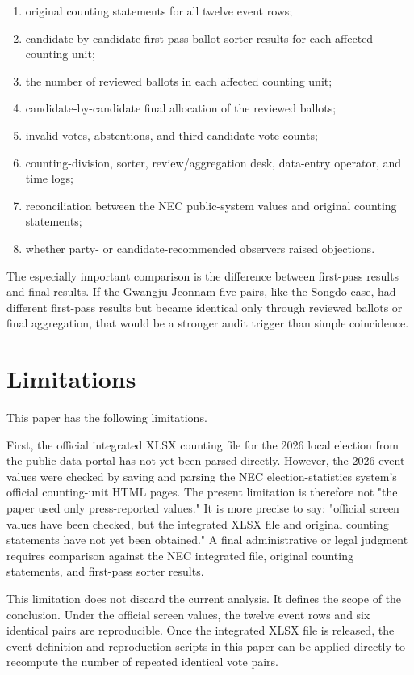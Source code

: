 \documentclass[preprint]{../ieie/IEIE}
\begin{document}
\begin{enumerate}
\item original counting statements for all twelve event rows;
\item candidate-by-candidate first-pass ballot-sorter results for each affected counting unit;
\item the number of reviewed ballots in each affected counting unit;
\item candidate-by-candidate final allocation of the reviewed ballots;
\item invalid votes, abstentions, and third-candidate vote counts;
\item counting-division, sorter, review/aggregation desk, data-entry operator, and time logs;
\item reconciliation between the NEC public-system values and original counting statements;
\item whether party- or candidate-recommended observers raised objections.
\end{enumerate}

The especially important comparison is the difference between first-pass results and final results. If the Gwangju-Jeonnam five pairs, like the Songdo case, had different first-pass results but became identical only through reviewed ballots or final aggregation, that would be a stronger audit trigger than simple coincidence.

\section{Limitations}

This paper has the following limitations.

First, the official integrated XLSX counting file for the 2026 local election from the public-data portal has not yet been parsed directly. However, the 2026 event values were checked by saving and parsing the NEC election-statistics system's official counting-unit HTML pages. The present limitation is therefore not "the paper used only press-reported values." It is more precise to say: "official screen values have been checked, but the integrated XLSX file and original counting statements have not yet been obtained." A final administrative or legal judgment requires comparison against the NEC integrated file, original counting statements, and first-pass sorter results.

This limitation does not discard the current analysis. It defines the scope of the conclusion. Under the official screen values, the twelve event rows and six identical pairs are reproducible. Once the integrated XLSX file is released, the event definition and reproduction scripts in this paper can be applied directly to recompute the number of repeated identical vote pairs.
\end{document}
